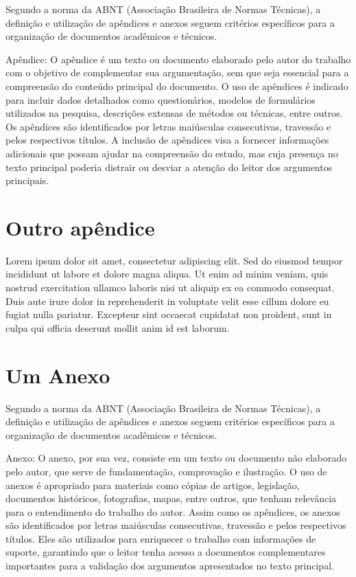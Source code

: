 \documentclass[dsc,setavermelha]{ufrj}
\theoremstyle{plain}
\theoremstyle{definition}
\theoremstyle{remark}
\begin{document}
Segundo a norma da ABNT (Associação Brasileira de Normas Técnicas), a definição e utilização de apêndices e anexos seguem critérios específicos para a organização de documentos acadêmicos e técnicos.

Apêndice: O apêndice é um texto ou documento elaborado pelo autor do trabalho com o objetivo de complementar sua argumentação, sem que seja essencial para a compreensão do conteúdo principal do documento. O uso de apêndices é indicado para incluir dados detalhados como questionários, modelos de formulários utilizados na pesquisa, descrições extensas de métodos ou técnicas, entre outros. Os apêndices são identificados por letras maiúsculas consecutivas, travessão e pelos respectivos títulos. A inclusão de apêndices visa a fornecer informações adicionais que possam ajudar na compreensão do estudo, mas cuja presença no texto principal poderia distrair ou desviar a atenção do leitor dos argumentos principais.

\chapter{Outro apêndice}

Lorem ipsum dolor sit amet, consectetur adipiscing elit. Sed do eiusmod tempor incididunt ut labore et dolore magna aliqua. Ut enim ad minim veniam, quis nostrud exercitation ullamco laboris nisi ut aliquip ex ea commodo consequat. Duis aute irure dolor in reprehenderit in voluptate velit esse cillum dolore eu fugiat nulla pariatur. Excepteur sint occaecat cupidatat non proident, sunt in culpa qui officia deserunt mollit anim id est laborum.

\annex

\chapter{Um Anexo}
Segundo a norma da ABNT (Associação Brasileira de Normas Técnicas), a definição e utilização de apêndices e anexos seguem critérios específicos para a organização de documentos acadêmicos e técnicos.

Anexo: O anexo, por sua vez, consiste em um texto ou documento não elaborado pelo autor, que serve de fundamentação, comprovação e ilustração. O uso de anexos é apropriado para materiais como cópias de artigos, legislação, documentos históricos, fotografias, mapas, entre outros, que tenham relevância para o entendimento do trabalho do autor. Assim como os apêndices, os anexos são identificados por letras maiúsculas consecutivas, travessão e pelos respectivos títulos. Eles são utilizados para enriquecer o trabalho com informações de suporte, garantindo que o leitor tenha acesso a documentos complementares importantes para a validação dos argumentos apresentados no texto principal.
\end{document}
